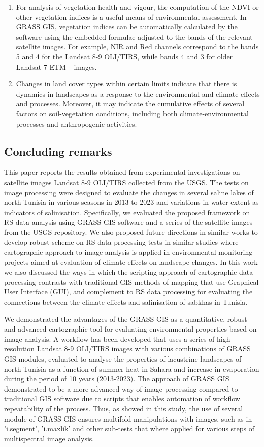 \documentclass[land,article,submit,pdftex,moreauthors]{Definitions/mdpi}
\begin{document}
\begin{enumerate}
	\item For analysis of vegetation health and vigour, the computation of the NDVI or other vegetation indices is a useful means of environmental assessment. In GRASS GIS, vegetation indices can be automatically calculated  by the software using the embedded formulae adjusted to the bands of the relevant satellite images. For example, NIR and Red channels correspond to the bands 5 and 4 for the Landsat 8-9 OLI/TIRS, while bands 4 and 3 for older Landsat 7 ETM+ images.
	\item Changes in land cover types within certain limits indicate that there is dynamics in landscapes as a response to the environmental and climate effects and processes. Moreover, it may indicate the cumulative effects of several factors on soil-vegetation conditions, including both climate-environmental processes and anthropogenic activities.
\end{enumerate}

\subsection{Concluding remarks}

This paper reports the results obtained from experimental investigations on satellite images Landsat 8-9 OLI/TIRS collected from the USGS. The tests on image processing were designed to evaluate the changes in several saline lakes of north Tunisia in various seasons in 2013 to 2023 and variations in water extent as indicators of salinisation. Specifically, we evaluated the proposed framework on RS data analysis using GRASS GIS software and a series of the satellite images from the USGS repository. We also proposed future directions in similar works to develop robust scheme on RS data processing tests in similar studies where cartographic approach to image analysis is applied in environmental monitoring projects aimed at evaluation of climate effects on landscape changes. In this work we also discussed the ways in which the scripting approach of cartographic data processing contrasts with traditional GIS methods of mapping that use Graphical User Interface (GUI), and complement to RS data processing for evaluating the connections between the climate effects and salinisation of sabkhas in Tunisia. 

We demonstrated the advantages of the GRASS GIS as a quantitative, robust and advanced cartographic tool for evaluating environmental properties based on image analysis. A workflow has been developed that uses a series of high-resolution Landsat 8-9 OLI/TIRS images with various combinations of GRASS GIS modules, evaluated to analyse the properties of lacustrine landscapes  of north Tunisia as a function of summer heat in Sahara and increase in evaporation during the period of 10 years (2013-2023). The approach of GRASS GIS demonstrated to be a more advanced way of image processing compared to traditional GIS software due to scripts that enables automation of workflow repeatability of the process. Thus, as showed in this study, the use of several module of GRASS GIS ensures multifold manipulations with images, such as in 'i.segment', 'i.maxlik' and other sub-tests that where applied for various steps of multispectral image analysis. 
\end{document}
